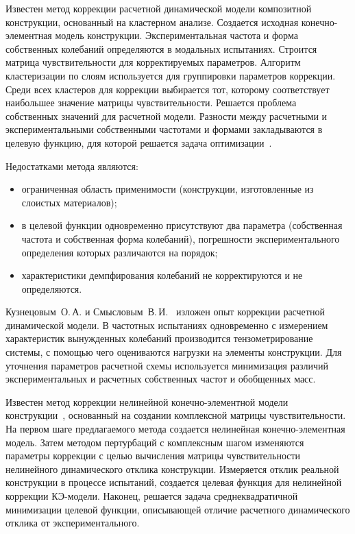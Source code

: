 Известен метод коррекции расчетной динамической модели композитной конструкции, основанный на кластерном анализе. Создается исходная конечно-элементная модель конструкции. Экспериментальная частота и форма собственных колебаний определяются в модальных испытаниях. Строится матрица чувствительности для корректируемых параметров. Алгоритм кластеризации по слоям используется для группировки параметров коррекции. Среди всех кластеров для коррекции выбирается тот, которому соответствует наибольшее значение матрицы чувствительности. Решается проблема собственных значений для расчетной модели. Разности между расчетными и экспериментальными собственными частотами и формами закладываются в целевую функцию, для которой решается задача оптимизации~\cite{lib:modelUpdating:CN107357992A}.

Недостатками метода являются: 
\begin{itemize}
	\item ограниченная область применимости (конструкции, изготовленные из слоистых материалов); 
	\item в целевой функции одновременно присутствуют два параметра (собственная частота и собственная форма колебаний), погрешности экспериментального определения которых различаются на порядок; 
	\item характеристики демпфирования колебаний не корректируются и не определяются. 
\end{itemize}

Кузнецовым~О.\,А. и Смысловым~В.\,И.~\cite{lib:modelUpdating:Kuznetsov} изложен опыт коррекции расчетной динамической модели. В частотных испытаниях одновременно с измерением характеристик вынужденных колебаний производится тензометрирование системы, с помощью чего оцениваются нагрузки на элементы конструкции. Для уточнения параметров расчетной схемы используется минимизация различий экспериментальных и расчетных собственных частот и обобщенных масс.

Известен метод коррекции нелинейной конечно-элементной модели конструкции~\cite{lib:modelUpdating:CN109885896A}, основанный на создании комплексной матрицы чувствительности. На первом шаге предлагаемого метода создается нелинейная конечно-элементная модель. Затем методом пертурбаций с комплексным шагом изменяются параметры коррекции с целью вычисления матрицы чувствительности нелинейного динамического отклика конструкции. Измеряется отклик реальной конструкции в процессе испытаний, создается целевая функция для нелинейной коррекции КЭ-модели. Наконец, решается задача среднеквадратичной минимизации целевой функции, описывающей отличие расчетного динамического отклика от экспериментального. 


